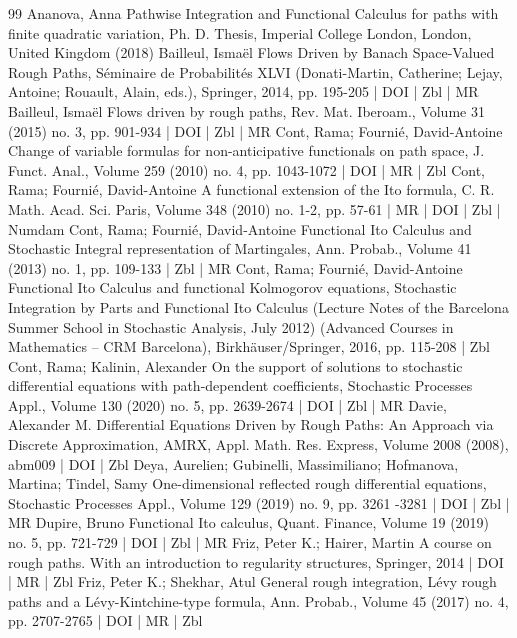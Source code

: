 \begin{thebibliography}{99}
Ananova, Anna Pathwise Integration and Functional Calculus for paths with finite quadratic variation, Ph. D. Thesis, Imperial College London, London, United Kingdom (2018)
Bailleul, Ismaël Flows Driven by Banach Space-Valued Rough Paths, Séminaire de Probabilités XLVI (Donati-Martin, Catherine; Lejay, Antoine; Rouault, Alain, eds.), Springer, 2014, pp. 195-205 | DOI | Zbl | MR
Bailleul, Ismaël Flows driven by rough paths, Rev. Mat. Iberoam., Volume 31 (2015) no. 3, pp. 901-934 | DOI | Zbl | MR
Cont, Rama; Fournié, David-Antoine Change of variable formulas for non-anticipative functionals on path space, J. Funct. Anal., Volume 259 (2010) no. 4, pp. 1043-1072 | DOI | MR | Zbl
Cont, Rama; Fournié, David-Antoine A functional extension of the Ito formula, C. R. Math. Acad. Sci. Paris, Volume 348 (2010) no. 1-2, pp. 57-61 | MR | DOI | Zbl | Numdam
Cont, Rama; Fournié, David-Antoine Functional Ito Calculus and Stochastic Integral representation of Martingales, Ann. Probab., Volume 41 (2013) no. 1, pp. 109-133 | Zbl | MR
Cont, Rama; Fournié, David-Antoine Functional Ito Calculus and functional Kolmogorov equations, Stochastic Integration by Parts and Functional Ito Calculus (Lecture Notes of the Barcelona Summer School in Stochastic Analysis, July 2012) (Advanced Courses in Mathematics – CRM Barcelona), Birkhäuser/Springer, 2016, pp. 115-208 | Zbl
Cont, Rama; Kalinin, Alexander On the support of solutions to stochastic differential equations with path-dependent coefficients, Stochastic Processes Appl., Volume 130 (2020) no. 5, pp. 2639-2674 | DOI | Zbl | MR
Davie, Alexander M. Differential Equations Driven by Rough Paths: An Approach via Discrete Approximation, AMRX, Appl. Math. Res. Express, Volume 2008 (2008), abm009 | DOI | Zbl
Deya, Aurelien; Gubinelli, Massimiliano; Hofmanova, Martina; Tindel, Samy One-dimensional reflected rough differential equations, Stochastic Processes Appl., Volume 129 (2019) no. 9, pp. 3261 -3281 | DOI | Zbl | MR
Dupire, Bruno Functional Ito calculus, Quant. Finance, Volume 19 (2019) no. 5, pp. 721-729 | DOI | Zbl | MR
Friz, Peter K.; Hairer, Martin A course on rough paths. With an introduction to regularity structures, Springer, 2014 | DOI | MR | Zbl
Friz, Peter K.; Shekhar, Atul General rough integration, Lévy rough paths and a Lévy-Kintchine-type formula, Ann. Probab., Volume 45 (2017) no. 4, pp. 2707-2765 | DOI | MR | Zbl

\end{thebibliography}
